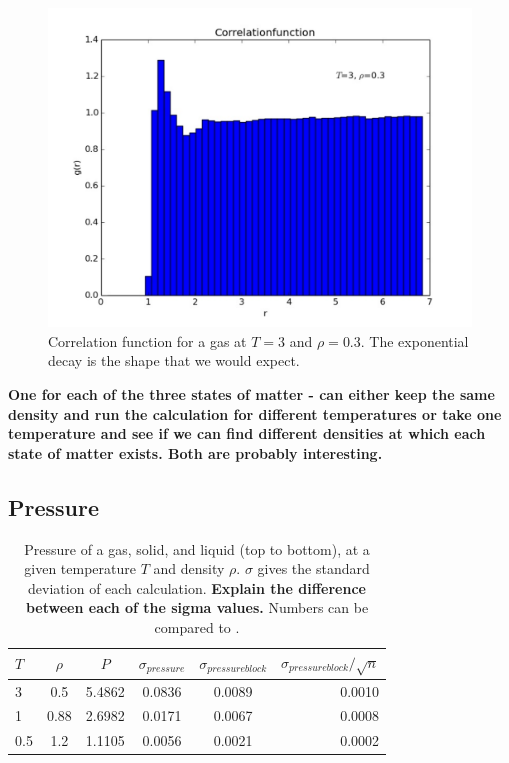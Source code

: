\documentclass{article}
\begin{document}
\begin{multicols}{2}
\begin{figure}[H]
\begin{center}
\includegraphics[width=\linewidth]{plots/correlationfunctionT3Rho03x.pdf}
\caption{Correlation function for a gas at $T=3$ and $\rho = 0.3$.  The exponential decay is the shape that we would expect.}
\label{corgas}
\end{center}
\end{figure}

\textbf{One for each of the three states of matter - can either keep the same density and run the calculation for different temperatures or take one temperature and see if we can find different densities at which each state of matter exists.  Both are probably interesting.}

\subsection{Pressure}

\begin{table}
\begin{center}
\begin{tabular}{| l | c | c | c | c | r |}
\hline  $T$ & $\rho$ & $P$ & $\sigma_{pressure}$ & $\sigma_{pressureblock}$ & $\sigma_{pressureblock}/ \sqrt n$ \\ \hline
  3 & 0.5 & 5.4862 & 0.0836 & 0.0089 & 0.0010 \\ \hline
  1 & 0.88 & 2.6982 & 0.0171 & 0.0067 & 0.0008 \\ \hline
  0.5 & 1.2 & 1.1105 & 0.0056 & 0.0021 & 0.0002 \\ \hline
\end{tabular}
\label{pressuretab}
\caption{Pressure of a gas, solid, and liquid (top to bottom), at a given temperature $T$ and density $\rho$.  $\sigma$ gives the standard deviation of each calculation.  \textbf{Explain the difference between each of the sigma values.}  Numbers can be compared to \cite{thijssen}.}
\end{center}
\end{table}


\end{multicols}
\end{document}
